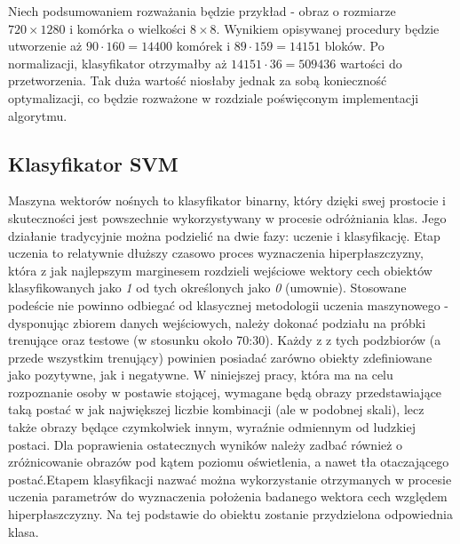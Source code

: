 Niech podsumowaniem rozważania będzie przykład - obraz o rozmiarze $720\times 1280$ i komórka o wielkości $8 \times 8$. Wynikiem opisywanej procedury będzie utworzenie aż $90\cdot160=14400$ komórek i $89\cdot 159=14151$ bloków. Po normalizacji, klasyfikator otrzymałby aż $14151\cdot36=509436$ wartości do przetworzenia. Tak duża wartość niosłaby jednak za sobą konieczność optymalizacji, co będzie rozważone w rozdziale poświęconym implementacji algorytmu.

\subsection{Klasyfikator SVM}
Maszyna wektorów nośnych to klasyfikator binarny, który dzięki swej prostocie i skuteczności jest powszechnie wykorzystywany w procesie odróżniania klas. Jego działanie tradycyjnie można podzielić na dwie fazy: uczenie i klasyfikację. \newline Etap uczenia to relatywnie dłuższy czasowo proces wyznaczenia hiperpłaszczyzny, która z jak najlepszym marginesem rozdzieli wejściowe wektory cech obiektów klasyfikowanych jako \textit{1} od tych określonych jako \textit{0} (umownie). Stosowane podeście nie powinno odbiegać od klasycznej metodologii uczenia maszynowego - dysponując zbiorem danych wejściowych, należy dokonać podziału na próbki trenujące oraz testowe (w stosunku około 70:30). Każdy z z tych podzbiorów (a przede wszystkim trenujący) powinien posiadać zarówno obiekty zdefiniowane jako pozytywne, jak i negatywne. W niniejszej pracy, która ma na celu rozpoznanie osoby w postawie stojącej, wymagane będą obrazy przedstawiające taką postać w jak największej liczbie kombinacji (ale w podobnej skali), lecz także obrazy będące czymkolwiek innym, wyraźnie odmiennym od ludzkiej postaci. Dla poprawienia ostatecznych wyników należy zadbać również o zróżnicowanie obrazów pod kątem poziomu oświetlenia, a nawet tła otaczającego postać.\newline Etapem klasyfikacji nazwać można wykorzystanie otrzymanych w procesie uczenia parametrów do wyznaczenia położenia badanego wektora cech względem hiperpłaszczyzny. Na tej podstawie do obiektu zostanie przydzielona odpowiednia klasa.

